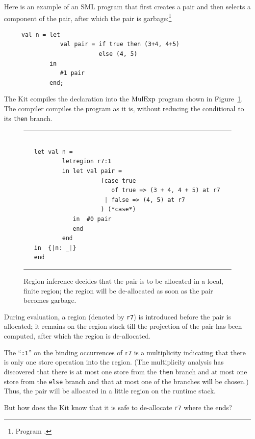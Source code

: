 \documentclass[12pt]{book}
\begin{document}
Here is an example of an SML program that first creates a pair and
then selects a component of the pair, after which the pair is garbage:\footnote{Program .}
\begin{verbatim}
     val n = let 
                val pair = if true then (3+4, 4+5) 
                           else (4, 5)
             in 
                #1 pair
             end;
\end{verbatim}
The Kit compiles the declaration into the 
$\hbox{\rm MulExp}$ program shown in Figure~\ref{elimpair.fig}.
The compiler compiles the program as it is, without reducing the conditional
to its {\tt then} branch.
\begin{figure}
\hrule
\begin{verbatim}

   let val n = 
           letregion r7:1 
           in let val pair = 
                      (case true 
                         of true => (3 + 4, 4 + 5) at r7 
                       | false => (4, 5) at r7
                      ) (*case*) 
              in  #0 pair
              end  
           end
   in  {|n: _|}
   end 
\end{verbatim}
\caption{Region inference decides that the 
pair is to be allocated in a local, finite region; the region will be de-allocated
as soon as the pair becomes garbage.}
\medskip

\hrule
\label{elimpair.fig}
\end{figure}
During evaluation, a region (denoted by {\tt r7}) 
is introduced before the pair is allocated;
it remains on the region stack till the projection of the pair
has been computed, after which the region is de-allocated. 

The ``{\tt :1}'' on the binding occurrences of {\tt r7}
is a multiplicity indicating that there is only one store
operation into the region. (The 
%
multiplicity analysis has discovered that there is at most one store
from the {\tt then} branch and at most one store from the {\tt else}
branch and that at most one of the branches will be chosen.) Thus, the
pair will be allocated in a little region on the runtime stack.

But how does the Kit know that it is safe to de-allocate {\tt r7}
where the  ends?
\end{document}
